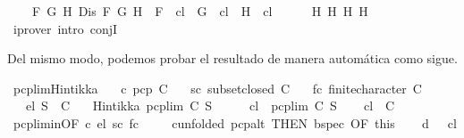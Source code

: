 \begin{isabellebody}
\ \ \ \ {\isacharparenleft}{\isasymforall}F\ G\ H{\isachardot}\ Dis\ F\ G\ H\ {\isasymlongrightarrow}\ F\ {\isasymin}\ {\isacharquery}cl\ {\isasymlongrightarrow}\ G\ {\isasymin}\ {\isacharquery}cl\ {\isasymor}\ H\ {\isasymin}\ {\isacharquery}cl{\isacharparenright}{\isachardoublequoteclose}\isanewline
\ \ \ \ \isamarkupfalse%
\ H{}\ H{}\ H{}\ H{}\ \isamarkupfalse%
\ {\isacharparenleft}iprover\ intro{\isacharcolon}\ conjI{\isacharparenright}\isanewline
{}\isamarkupfalse%
%
\endisatagproof
{\isafoldproof}%
%
\isadelimproof
%
\endisadelimproof
%
\begin{isamarkuptext}%
Del mismo modo, podemos probar el resultado de manera automática como sigue.%
\end{isamarkuptext}\isamarkuptrue%
\isamarkupfalse%
\ pcp{\isacharunderscore}lim{\isacharunderscore}Hintikka{\isacharcolon}\isanewline
\ \ \ c{\isacharcolon}\ {\isachardoublequoteopen}pcp\ C{\isachardoublequoteclose}\isanewline
\ \ \ sc{\isacharcolon}\ {\isachardoublequoteopen}subset{\isacharunderscore}closed\ C{\isachardoublequoteclose}\isanewline
\ \ \ fc{\isacharcolon}\ {\isachardoublequoteopen}finite{\isacharunderscore}character\ C{\isachardoublequoteclose}\isanewline
\ \ \ el{\isacharcolon}\ {\isachardoublequoteopen}S\ {\isasymin}\ C{\isachardoublequoteclose}\isanewline
\ \ \ {\isachardoublequoteopen}Hintikka\ {\isacharparenleft}pcp{\isacharunderscore}lim\ C\ S{\isacharparenright}{\isachardoublequoteclose}\isanewline
%
\isadelimproof
%
\endisadelimproof
%
\isatagproof
{}\isamarkupfalse%
\ {\isacharminus}\isanewline
\ \ \isamarkupfalse%
\ {\isacharquery}cl\ {\isacharequal}\ {\isachardoublequoteopen}pcp{\isacharunderscore}lim\ C\ S{\isachardoublequoteclose}\isanewline
\ \ \isamarkupfalse%
\ {\isachardoublequoteopen}{\isacharquery}cl\ {\isasymin}\ C{\isachardoublequoteclose}\ \isamarkupfalse%
\ pcp{\isacharunderscore}lim{\isacharunderscore}in{\isacharbrackleft}OF\ c\ el\ sc\ fc{\isacharbrackright}\ \isacommand{{\isachardot}}\isamarkupfalse%
\isanewline
\ \ \isamarkupfalse%
\ c{\isacharbrackleft}unfolded\ pcp{\isacharunderscore}alt{\isacharcomma}\ THEN\ bspec{\isacharcomma}\ OF\ this{\isacharbrackright}\isanewline
\ \ \isamarkupfalse%
\ d{\isacharcolon}\ {\isachardoublequoteopen}{\isasymbottom}\ {\isasymnotin}\ {\isacharquery}cl{\isachardoublequoteclose}\isanewline

\end{isabellebody}
